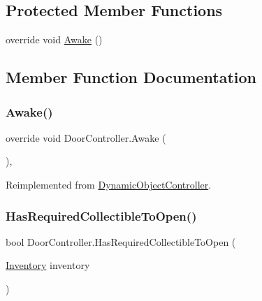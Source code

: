 \subsection*{Protected Member Functions}
\begin{DoxyCompactItemize}
\item 
override void \mbox{\hyperlink{class_door_controller_a8da71e19b95345820ad936a20bce14dc}{Awake}} ()
\end{DoxyCompactItemize}


\subsection{Member Function Documentation}
\mbox{\label{class_door_controller_a8da71e19b95345820ad936a20bce14dc}} 
\subsubsection{\texorpdfstring{Awake()}{Awake()}}
{\footnotesize\ttfamily override void Door\+Controller.\+Awake (\begin{DoxyParamCaption}{ }\end{DoxyParamCaption})\hspace{0.3cm}{\ttfamily [protected]}, {\ttfamily [virtual]}}



Reimplemented from \mbox{\hyperlink{class_dynamic_object_controller_ac82dd85f0560a3ba17e50cc1254fbca3}{Dynamic\+Object\+Controller}}.

\mbox{\label{class_door_controller_ae6bc3cbda562420279d49ea9f597a33c}} 
\subsubsection{\texorpdfstring{Has\+Required\+Collectible\+To\+Open()}{HasRequiredCollectibleToOpen()}}
{\footnotesize\ttfamily bool Door\+Controller.\+Has\+Required\+Collectible\+To\+Open (\begin{DoxyParamCaption}\item[{\mbox{\hyperlink{class_inventory}{Inventory}}}]{inventory }\end{DoxyParamCaption})}

